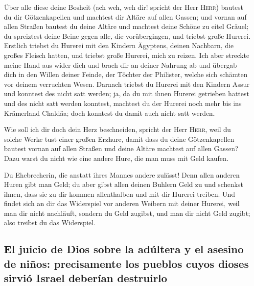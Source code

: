  Über alle diese deine Bosheit (ach weh, weh dir! spricht
der Herr \textsc{Herr})  bautest du dir Götzenkapellen
und machtest dir Altäre auf allen Gassen;  und vornan auf
allen Straßen bautest du deine Altäre und machtest deine Schöne zu eitel
Gräuel; du spreiztest deine Beine gegen alle, die vorübergingen, und
triebst große Hurerei.  Erstlich triebst du Hurerei mit
den Kindern Ägyptens, deinen Nachbarn, die großes Fleisch hatten, und
triebst große Hurerei, mich zu reizen.  Ich aber streckte
meine Hand aus wider dich und brach dir an deiner Nahrung ab und übergab
dich in den Willen deiner Feinde, der Töchter der Philister, welche sich
schämten vor deinem verruchten Wesen.  Darnach triebst du
Hurerei mit den Kindern Assur und konntest des nicht satt werden; ja, da
du mit ihnen Hurerei getrieben hattest und des nicht satt werden
konntest,  machtest du der Hurerei noch mehr bis ins
Krämerland Chaldäa; doch konntest du damit auch nicht satt werden.

 Wie soll ich dir doch dein Herz beschneiden, spricht der
Herr \textsc{Herr}, weil du solche Werke tust einer großen Erzhure,
 damit dass du deine Götzenkapellen bautest vornan auf
allen Straßen und deine Altäre machtest auf allen Gassen? Dazu warst du
nicht wie eine andere Hure, die man muss mit Geld kaufen.

 Du Ehebrecherin, die anstatt ihres Mannes andere
zulässt!  Denn allen anderen Huren gibt man Geld; du aber
gibst allen deinen Buhlern Geld zu und schenkst ihnen, dass sie zu dir
kommen allenthalben und mit dir Hurerei treiben.  Und
findet sich an dir das Widerspiel vor anderen Weibern mit deiner
Hurerei, weil man dir nicht nachläuft, sondern du Geld zugibst, und man
dir nicht Geld zugibt; also treibst du das Widerspiel.

\hypertarget{el-juicio-de-dios-sobre-la-aduxfaltera-y-el-asesino-de-niuxf1os-precisamente-los-pueblos-cuyos-dioses-sirviuxf3-israel-deberuxedan-destruirlo}{%
\subsection{El juicio de Dios sobre la adúltera y el asesino de niños:
precisamente los pueblos cuyos dioses sirvió Israel deberían
destruirlo}\label{el-juicio-de-dios-sobre-la-aduxfaltera-y-el-asesino-de-niuxf1os-precisamente-los-pueblos-cuyos-dioses-sirviuxf3-israel-deberuxedan-destruirlo}}

